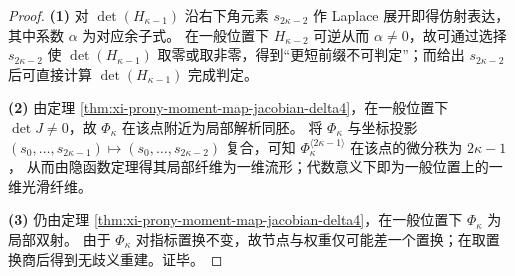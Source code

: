 \begin{proof}
\textbf{(1)}
对 \(\det(H_{\kappa-1})\) 沿右下角元素 \(s_{2\kappa-2}\) 作 Laplace 展开即得仿射表达，其中系数 \(\alpha\) 为对应余子式。
在一般位置下 \(H_{\kappa-2}\) 可逆从而 \(\alpha\neq 0\)，故可通过选择 \(s_{2\kappa-2}\) 使 \(\det(H_{\kappa-1})\) 取零或取非零，得到“更短前缀不可判定”；而给出 \(s_{2\kappa-2}\) 后可直接计算 \(\det(H_{\kappa-1})\) 完成判定。
\par
\textbf{(2)}
由定理 \ref{thm:xi-prony-moment-map-jacobian-delta4}，在一般位置下 \(\det J\neq 0\)，故 \(\Phi_\kappa\) 在该点附近为局部解析同胚。
将 \(\Phi_\kappa\) 与坐标投影 \((s_0,\dots,s_{2\kappa-1})\mapsto(s_0,\dots,s_{2\kappa-2})\) 复合，可知 \(\Phi_{\kappa}^{\langle 2\kappa-1\rangle}\) 在该点的微分秩为 \(2\kappa-1\)，
从而由隐函数定理得其局部纤维为一维流形；代数意义下即为一般位置上的一维光滑纤维。
\par
\textbf{(3)}
仍由定理 \ref{thm:xi-prony-moment-map-jacobian-delta4}，在一般位置下 \(\Phi_\kappa\) 为局部双射。
由于 \(\Phi_\kappa\) 对指标置换不变，故节点与权重仅可能差一个置换；在取置换商后得到无歧义重建。证毕。
\end{proof}
